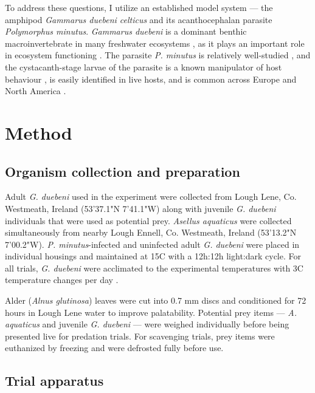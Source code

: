 To address these questions, I utilize an established model system --- the amphipod \emph{Gammarus duebeni celticus} and its acanthocephalan parasite \emph{Polymorphus minutus}. \emph{Gammarus duebeni} is a dominant benthic macroinvertebrate in many freshwater ecosystems \citep{mortensen1982, kelly2006}, as it plays an important role in ecosystem functioning \citep{macneil1997, sutcliffe2000}. The parasite \emph{P. minutus} is relatively well-studied \citep{dezfuli1999, bailly2017}, and the cystacanth-stage larvae of the parasite is a known manipulator of host behaviour \citep{jacquin2014}, is easily identified in live hosts, and is common across Europe and North America \citep{vancleave1951}. 


\section{Method}

\subsection{Organism collection and preparation}

Adult \emph{G. duebeni} used in the experiment were collected from Lough Lene, Co. Westmeath, Ireland (53'37.1"N 7'41.1"W) along with juvenile \emph{G. duebeni} individuals that were used as potential prey. \emph{Asellus aquaticus} were collected simultaneously from nearby Lough Ennell, Co. Westmeath, Ireland (53'13.2"N 7'00.2"W). \emph{P. minutus}-infected and uninfected adult \emph{G. duebeni} were placed in individual housings and maintained at 15\degree C  with a 12h:12h light:dark cycle. For all trials, \emph{G. duebeni} were acclimated to the experimental temperatures with 3\degree C  temperature changes per day \citep{penk2016}.

Alder (\emph{Alnus glutinosa}) leaves were cut into 0.7 mm discs and conditioned for 72 hours in Lough Lene water to improve palatability. Potential prey items --- \emph{A. aquaticus} and juvenile \emph{G. duebeni} --- were weighed individually before being presented live for predation trials. For scavenging trials, prey items were euthanized by freezing and were defrosted fully before use. 

\subsection{Trial apparatus}

